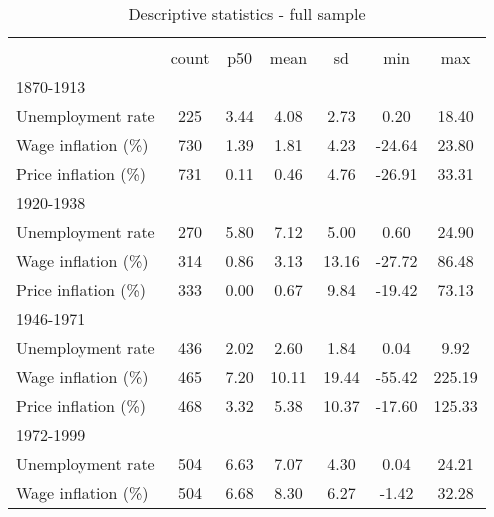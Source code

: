 \begin{table}[htbp]\centering
\def\sym#1{\ifmmode^{#1}\else\(^{#1}\)\fi}
\caption{Descriptive statistics - full sample \label{T:Descriptives-Full}}
\begin{tabular}{l*{1}{cccccc}}
\hline\hline
                    &\multicolumn{6}{c}{}                                                         \\
                    &       count&         p50&        mean&          sd&         min&         max\\
\hline
1870-1913           &            &            &            &            &            &            \\
Unemployment rate   &         225&        3.44&        4.08&        2.73&        0.20&       18.40\\
Wage inflation (\%) &         730&        1.39&        1.81&        4.23&      -24.64&       23.80\\
Price inflation (\%)&         731&        0.11&        0.46&        4.76&      -26.91&       33.31\\
\hline
1920-1938           &            &            &            &            &            &            \\
Unemployment rate   &         270&        5.80&        7.12&        5.00&        0.60&       24.90\\
Wage inflation (\%) &         314&        0.86&        3.13&       13.16&      -27.72&       86.48\\
Price inflation (\%)&         333&        0.00&        0.67&        9.84&      -19.42&       73.13\\
\hline
1946-1971           &            &            &            &            &            &            \\
Unemployment rate   &         436&        2.02&        2.60&        1.84&        0.04&        9.92\\
Wage inflation (\%) &         465&        7.20&       10.11&       19.44&      -55.42&      225.19\\
Price inflation (\%)&         468&        3.32&        5.38&       10.37&      -17.60&      125.33\\
\hline
1972-1999           &            &            &            &            &            &            \\
Unemployment rate   &         504&        6.63&        7.07&        4.30&        0.04&       24.21\\
Wage inflation (\%) &         504&        6.68&        8.30&        6.27&       -1.42&       32.28\\

\end{tabular}
\end{table}
